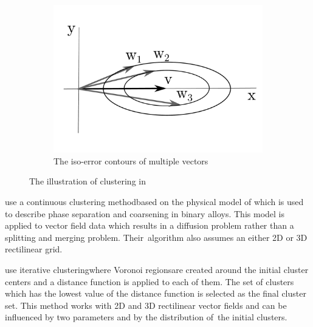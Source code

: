 \begin{figure}[h]
\begin{subfigure}{0.4\textwidth}
    	\includegraphics[width=\textwidth]{./illustrations/telea-ellipse_contours-embedded_font.pdf}
    	\caption{The iso-error contours of multiple vectors}
	\end{subfigure}
\caption[The illustration of clustering in \citet{Telea99}]{The illustration of clustering in \citet{Telea99}}
\label{fig:illustration-telea_hierarchical_clustering}
\end{figure}

\citet{Garcke00} use a continuous clustering method\footnotemark based on the physical model of \citet{CahnHilliard58} which is used to describe phase separation and coarsening in binary alloys. This model is applied to vector field data which results in a diffusion problem rather than a splitting and merging problem. Their~algorithm also assumes an either 2D or 3D rectilinear grid.


\citet{Du04} use iterative clustering\footnotemark where Voronoi regions\footnotemark are created around the initial cluster centers and a distance function is applied to each of them. The set of clusters which has the lowest value of the distance function is selected as the final cluster set. This method works with 2D and 3D rectilinear vector fields and can be influenced by two parameters and by the distribution of~the initial clusters.

\addtocounter{footnote}{-2}

